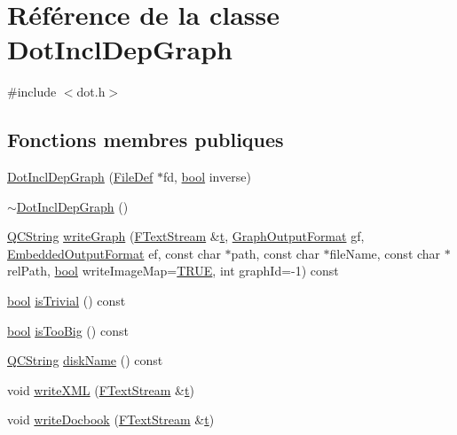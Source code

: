 \hypertarget{class_dot_incl_dep_graph}{}\section{Référence de la classe Dot\+Incl\+Dep\+Graph}
\label{class_dot_incl_dep_graph}


{\ttfamily \#include $<$dot.\+h$>$}

\subsection*{Fonctions membres publiques}
\begin{DoxyCompactItemize}
\item 
\hyperlink{class_dot_incl_dep_graph_a1cb9852930bcf289edd2e3ab54529cba}{Dot\+Incl\+Dep\+Graph} (\hyperlink{class_file_def}{File\+Def} $\ast$fd, \hyperlink{qglobal_8h_a1062901a7428fdd9c7f180f5e01ea056}{bool} inverse)
\item 
\hyperlink{class_dot_incl_dep_graph_af6d8bd77179230c06b11a35a14f9f390}{$\sim$\+Dot\+Incl\+Dep\+Graph} ()
\item 
\hyperlink{class_q_c_string}{Q\+C\+String} \hyperlink{class_dot_incl_dep_graph_a69dd6d17f9049399bbfc69161bc2c840}{write\+Graph} (\hyperlink{class_f_text_stream}{F\+Text\+Stream} \&\hyperlink{058__bracket__recursion_8tcl_a69e959f6901827e4d8271aeaa5fba0fc}{t}, \hyperlink{dot_8h_ac60ef98d62b78366a17c9f1bda96523f}{Graph\+Output\+Format} gf, \hyperlink{dot_8h_a8680135da08a5ef57cebe20060912dcc}{Embedded\+Output\+Format} ef, const char $\ast$path, const char $\ast$file\+Name, const char $\ast$rel\+Path, \hyperlink{qglobal_8h_a1062901a7428fdd9c7f180f5e01ea056}{bool} write\+Image\+Map=\hyperlink{qglobal_8h_a04a6422a52070f0dc478693da640242b}{T\+R\+U\+E}, int graph\+Id=-\/1) const 
\item 
\hyperlink{qglobal_8h_a1062901a7428fdd9c7f180f5e01ea056}{bool} \hyperlink{class_dot_incl_dep_graph_a4ac6198917ba1ca7f22cf77fdc84efbf}{is\+Trivial} () const 
\item 
\hyperlink{qglobal_8h_a1062901a7428fdd9c7f180f5e01ea056}{bool} \hyperlink{class_dot_incl_dep_graph_abb619bef0cedfe5803e17a0755e6c431}{is\+Too\+Big} () const 
\item 
\hyperlink{class_q_c_string}{Q\+C\+String} \hyperlink{class_dot_incl_dep_graph_abd97d0adf66c9461a39a166c618054cb}{disk\+Name} () const 
\item 
void \hyperlink{class_dot_incl_dep_graph_a878fed6c8d534073d3f9f4a7dfdc23a3}{write\+X\+M\+L} (\hyperlink{class_f_text_stream}{F\+Text\+Stream} \&\hyperlink{058__bracket__recursion_8tcl_a69e959f6901827e4d8271aeaa5fba0fc}{t})
\item 
void \hyperlink{class_dot_incl_dep_graph_ac3aa273c0549ac56a52d0d7efadeb6e9}{write\+Docbook} (\hyperlink{class_f_text_stream}{F\+Text\+Stream} \&\hyperlink{058__bracket__recursion_8tcl_a69e959f6901827e4d8271aeaa5fba0fc}{t})
\end{DoxyCompactItemize}


